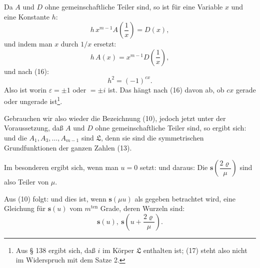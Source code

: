 
Da $A$ und $D$ ohne gemeinschaftliche Teiler sind, so ist für eine Variable $x$ und eine Konstante $h$:
\[
h\,x^{m-1} A\!\left(\frac{1}{x}\right) = D(x),
\]
und indem man $x$ durch $1/x$ ersetzt:
\[
h\,A(x) = x^{m-1} D\!\left(\frac{1}{x}\right),
\]
und nach (16):
\[
h^2 = (-1)^{cx}.
\]
Also ist
worin $\varepsilon = \pm 1$ oder $= \pm i$ ist. Das hängt nach (16) davon ab, ob $cx$ gerade oder ungerade ist\footnote{Aus § 138 ergibt sich, daß $i$ im Körper $\mathfrak{L}$ enthalten ist; (17) steht also nicht im Widerspruch mit dem Satze 2.}.

Gebrauchen wir also wieder die Bezeichnung (10), jedoch jetzt unter der Voraussetzung, daß $A$ und $D$ ohne gemeinschaftliche Teiler sind, so ergibt sich:
und die $A_1, A_3, \ldots, A_{m-1}$ sind  $\mathfrak{L}$, denn sie sind die symmetrischen Grundfunktionen der ganzen Zahlen (13).

Im besonderen ergibt sich, wenn man $u=0$ setzt:
und daraus:
Die $\boldsymbol{s}\!\left(\dfrac{2\varrho}{\mu}\right)$ sind also Teiler von $\mu$.

Aus (10) folgt:
und dies ist, wenn $\boldsymbol{s}(\mu u)$ als gegeben betrachtet wird, eine Gleichung für $\boldsymbol{s}(u)$ vom $m^{\text{ten}}$ Grade, deren Wurzeln sind:
\[
\boldsymbol{s}(u),\ \boldsymbol{s}\!\left(u+\frac{2\varrho}{\mu}\right).
\]
